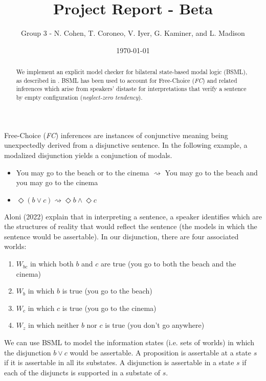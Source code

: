 \documentclass[11pt,a4paper]{article}
\title{Project Report - Beta}
\author{Group 3 - N. Cohen, T. Coroneo, V. Iyer, G. Kaminer, and L. Madison}
\date{\today}
\begin{document}
\maketitle

\begin{abstract}
We implement an explicit model checker for bilateral state-based modal logic
(BSML), as described in \cite{Aloni2024}. BSML has been used to account for
Free-Choice (\textit{FC}) and related inferences which arise from speakers' distaste for
interpretations that verify a sentence by empty configuration  (\textit{neglect-zero tendency}).
\end{abstract}

Free-Choice (\textit{FC}) inferences are instances of conjunctive meaning being unexpectedly
derived from a disjunctive sentence. In the following example, a modalized disjunction yields
a conjunction of modals.

\begin{itemize}
\item You may go to the beach or to the cinema $\rightsquigarrow$ You may go to the beach
 and you may go to the cinema
\item $\Diamond(b\vee c)\rightsquigarrow\Diamond b \wedge \Diamond c$
\end{itemize}

Aloni (2022) explain that in interpreting a sentence, a speaker identifies which are the structures of
reality that would reflect the sentence (the models in which the sentence would be assertable).
In our disjunction, there are four associated worlds:

\begin{enumerate}
\item $W_{bc}$ in which both $b$ and $c$ are true (you go to both the beach and the cinema)
\item $W_b$ in which $b$ is true (you go to the beach)
\item $W_c$ in which $c$ is true (you go to the cinema)
\item $W_z$ in which neither $b$ nor $c$ is true (you don't go anywhere)
\end{enumerate}

We can use BSML to model the information states (i.e. sets of worlds) in which the disjunction $b\vee c$
would be assertable. A proposition is assertable at a state $s$ if it is assertable in all its substates.
A disjunction is assertable in a state $s$ if each of the disjuncts is supported in a substate of $s$.
\end{document}
